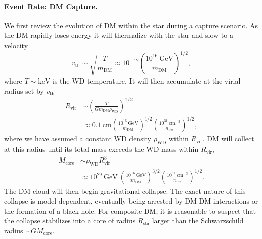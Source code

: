 \documentclass[twocolumn, preprintnumbers,amsmath,amssymb,prd, superscriptaddress]{revtex4}
\newcommand{\GeV}{\text{GeV}}
\newcommand{\keV}{\text{keV}}
\newcommand{\cm}{\text{cm}}
\def\r{\right)}
\def\l{\left(}
\begin{document}
\paragraph{Event Rate: DM Capture.}
We first review the evolution of DM within the star during a capture scenario.
As the DM rapidly loses energy it will thermalize with the star and slow to a velocity
\begin{equation}
v_\text{th} \sim \sqrt{\frac{T}{m_\text{DM}}} \approx 10^{-12} \l \frac{10^{16} ~\GeV}{m_\text{DM}}\r^{1/2},
\end{equation}
where $T \sim \keV$ is the WD temperature.
It will then accumulate at the virial radius set by $v_\text{th}$
\begin{align}
  R_\text{vir} &\sim \l \frac{T}{G m_\text{DM} \rho_\text{WD}}\r^{1/2} \\
  &\approx 0.1 ~\text{cm} \l \frac{10^{16} ~\GeV}{m_\text{DM}}\r^{1/2}
  \l \frac{10^{31} ~\cm^{-3}}{n_\text{ion}}\r^{1/2}, \nonumber
\end{align}
where we have assumed a constant WD density $\rho_\text{WD}$ within $R_\text{vir}$.
DM will collect at this radius until its total mass exceeds the WD mass within $R_\text{vir}$,
\begin{align}
    M_\text{core} &\sim \rho_\text{WD} R^3_\text{vir} \\
    &\approx 10^{29}~\GeV ~\l \frac{10^{16} ~\GeV}{m_\text{DM}}\r^{3/2}
  \l \frac{10^{31} ~\cm^{-3}}{n_\text{ion}}\r^{1/2}. \nonumber
\end{align}
The DM cloud will then begin gravitational collapse.
The exact nature of this collapse is model-dependent, eventually being arrested by DM-DM interactions or the formation of a black hole.
For composite DM, it is reasonable to suspect that the collapse stabilizes into a core of radius $R_\text{sta}$ larger than the Schwarzschild radius $\sim G M_\text{core}$.
\end{document}
